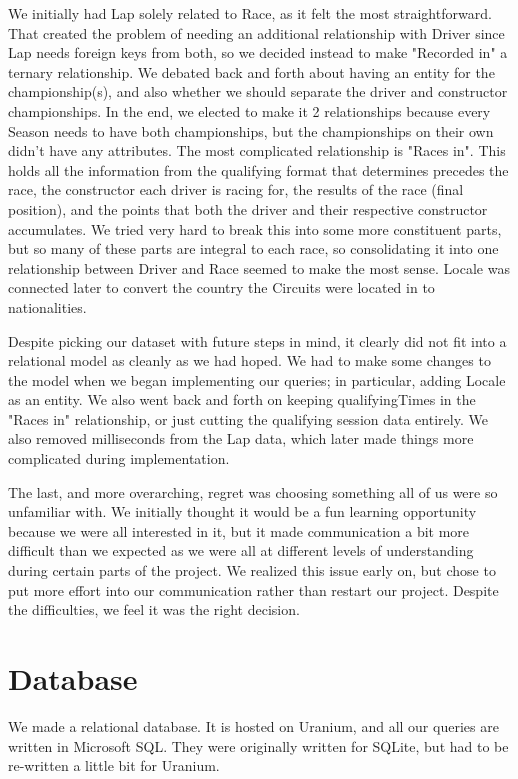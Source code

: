 \documentclass[]{article}
\begin{document}
We initially had Lap solely related to Race, as it felt the most straightforward. That created the problem of needing an additional relationship with Driver since Lap needs foreign keys from both, so we decided instead to make "Recorded in" a ternary relationship. We debated back and forth about having an entity for the championship(s), and also whether we should separate the driver and constructor championships. In the end, we elected to make it 2 relationships because every Season needs to have both championships, but the championships on their own didn't have any attributes. The most complicated relationship is "Races in". This holds all the information from the qualifying format that determines precedes the race, the constructor each driver is racing for, the results of the race (final position), and the points that both the driver and their respective constructor accumulates. We tried very hard to break this into some more constituent parts, but so many of these parts are integral to each race, so consolidating it into one relationship between Driver and Race seemed to make the most sense. Locale was connected later to convert the country the Circuits were located in to nationalities. 

Despite picking our dataset with future steps in mind, it clearly did not fit into a relational model as cleanly as we had hoped. We had to make some changes to the model when we began implementing our queries; in particular, adding Locale as an entity. We also went back and forth on keeping qualifyingTimes in the "Races in" relationship, or just cutting the qualifying session data entirely. We also removed milliseconds from the Lap data, which later made things more complicated during implementation. 

The last, and more overarching, regret was choosing something all of us were so unfamiliar with. We initially thought it would be a fun learning opportunity because we were all interested in it, but it made communication a bit more difficult than we expected as we were all at different levels of understanding during certain parts of the project. We realized this issue early on, but chose to put more effort into our communication rather than restart our project. Despite the difficulties, we feel it was the right decision.

\section{Database}

We made a relational database. It is hosted on Uranium, and all our queries are written in Microsoft SQL. They were originally written for SQLite, but had to be re-written a little bit for Uranium. 
\end{document}
